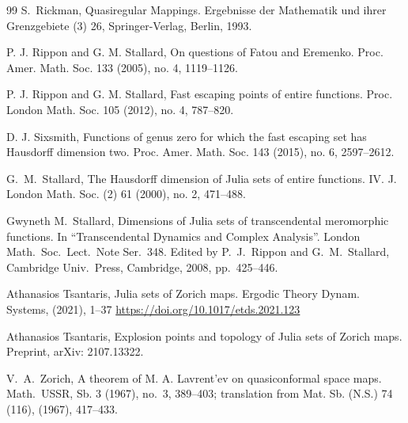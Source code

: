 \documentclass[12pt,a4paper]{amsart}
\theoremstyle{plain}
\theoremstyle{definition}
\theoremstyle{remark}
\numberwithin{equation}{section}
\begin{document}
\begin{thebibliography}{99}
S.\ Rickman,
Quasiregular Mappings.
Ergebnisse der Mathematik und ihrer Grenz\-gebiete (3) 26,
Springer-Verlag, Berlin, 1993.

P. J. Rippon and G. M. Stallard,
On questions of Fatou and Eremenko.
 Proc. Amer. Math. Soc.
133 (2005), no. 4, 1119--1126.

P. J. Rippon and G. M. Stallard,
Fast escaping points of entire functions.
 Proc. London Math. Soc.
105 (2012), no. 4, 787--820.

D. J. Sixsmith, Functions of genus zero for which the fast escaping set
has Hausdorff dimension two. 
Proc. Amer. Math. Soc. 143 (2015), no. 6, 2597--2612. 

 G.\ M.\ Stallard,
The Hausdorff dimension of Julia sets of entire functions. IV.
J. London Math. Soc. (2) 61 (2000), no. 2, 471--488.

 Gwyneth M.\ Stallard,
Dimensions of Julia sets of transcendental meromorphic functions.
In ``Transcendental Dynamics and Complex Analysis''.
London Math.\ Soc.\ Lect.\ Note Ser.\ 348.
Edited by P.\ J.\ Rippon
and G.\ M.\ Stallard,
Cambridge Univ.\ Press, Cambridge, 2008, pp.~425--446.

Athanasios Tsantaris,
Julia sets of Zorich maps.
Ergodic Theory Dynam. Systems, (2021), 1--37
\url{https://doi.org/10.1017/etds.2021.123}

Athanasios Tsantaris,
Explosion points and topology of Julia sets of Zorich maps.
Preprint, arXiv: 2107.13322.

V.\ A.\ Zorich,
A theorem of M. A. Lavrent'ev on quasiconformal space maps.
Math.\ USSR, Sb. 3 (1967), no.~3, 389--403; translation from
Mat. Sb. (N.S.)  74 (116),  (1967), 417--433.

\end{thebibliography}
\end{document}
